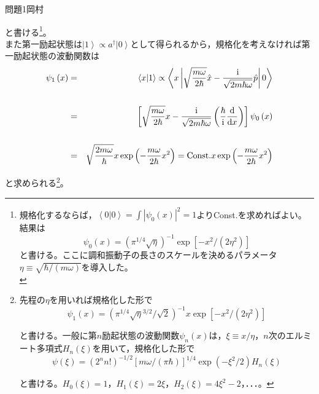 \documentclass[fleqn]{jbook}
\begin{document}
\begin{answer}{問題1}{岡村}
\begin{enumerate}
  と書ける\footnote{規格化するならば，$\left\langle 0|0\right\rangle = \int \left| \psi_0\left(x\right) \right|^2=1$より{\rm Const.}を求めればよい。結果は
 \begin{equation}
 \psi_0 \left(x\right) = \left( \pi^{1/4}\sqrt{\eta} \right)^{-1}\exp\left[ -x^2/\left( 2\eta^2 \right) \right] 
 \end{equation}
 と書ける。ここに調和振動子の長さのスケールを決めるパラメータ$\eta  \equiv \sqrt {\hbar /\left( {m\omega } \right)} $を導入した。\\
 
 }。\\
 また第一励起状態は$\left| 1 \right\rangle  \propto a^{\dagger} \left| 0 \right\rangle $として得られるから，規格化を考えなければ第一励起状態の波動関数は
  \begin{eqnarray}
  \psi _1 \left( x \right) &=& \left\langle {x}|{1} \right\rangle \propto \left\langle {x\left| {\sqrt {\frac{{m\omega }}{{2\hbar }}} \hat x - \frac{{\rm i}}{{\sqrt {2m\hbar \omega } }}\hat p} \right|0} \right\rangle  \cr 
  & & \cr
   &=& \left[ {\sqrt {\frac{{m\omega }}{{2\hbar }}} x - \frac{{\rm i}}{{\sqrt {2m\hbar \omega } }}\left( {\frac{\hbar }{{\rm i}}\frac{{\rm d}}{{{\rm d}x}}} \right)} \right]\psi _0 \left( x \right) \cr 
   & & \cr
   &=& \sqrt {\frac{{2m\omega }}{\hbar }} x\exp \left( { - \frac{{m\omega }}{{2\hbar }}x^2 } \right) = {\rm Const.}x\exp \left( { - \frac{{m\omega }}{{2\hbar }}x^2 } \right) 
  \end{eqnarray}
  
  と求められる\footnote{先程の$\eta$を用いれば規格化した形で
  \begin{equation}
  \psi _1 \left( x \right) = \left( \pi^{1/4}\sqrt{\eta}^{3/2}/\sqrt{2} \right)^{-1}x\exp\left[ -x^2/\left( 2\eta^2 \right) \right] 
  \end{equation}
  
    と書ける。一般に第$n$励起状態の波動関数$\psi_n\left( x \right)$は，$\xi\equiv x/\eta$，$n$次のエルミート多項式$H_n\left( \xi \right)$を用いて，規格化した形で
    \begin{equation}
    \psi\left( \xi \right) = \left( 2^n n! \right)^{-1/2}\left[ m\omega/\left( \pi\hbar \right) \right]^{1/4}\exp\left( -\xi^2/2 \right)H_n\left( \xi \right) 
    \end{equation}
    
    と書ける。$H_0\left( \xi \right)=1$，$H_1\left( \xi \right)=2\xi$，$H_2\left( \xi \right)=4\xi^2-2$，．．．。}。\\
  

\end{enumerate}
\end{answer}
\end{document}
